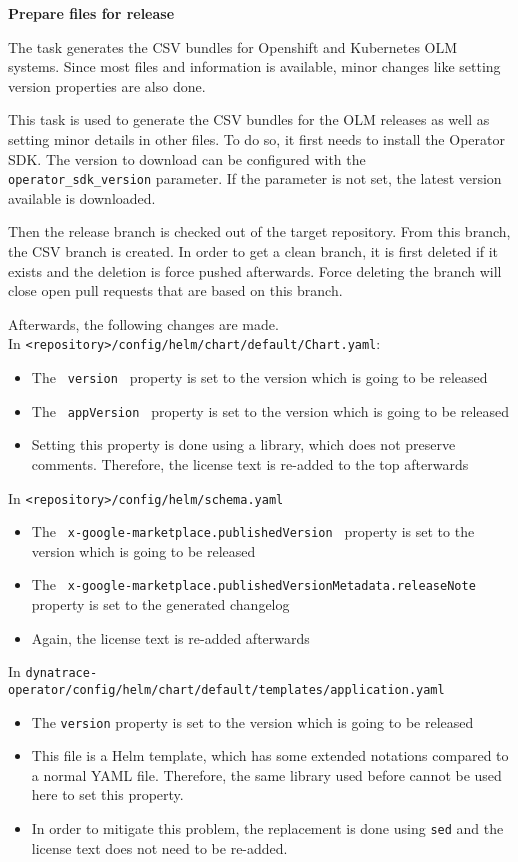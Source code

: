 \textbf{Prepare files for release}

The task generates the CSV bundles for Openshift and Kubernetes OLM systems.
Since most files and information is available, minor changes like setting version properties are also done.

This task is used to generate the CSV bundles for the OLM releases as well as setting minor details in other files.
To do so, it first needs to install the Operator SDK.
The version to download can be configured with the \verb|operator_sdk_version| parameter.
If the parameter is not set, the latest version available is downloaded.

\pagebreak

Then the release branch is checked out of the target repository.
From this branch, the CSV branch is created.
In order to get a clean branch, it is first deleted if it exists and the deletion is force pushed afterwards.
Force deleting the branch will close open pull requests that are based on this branch.

Afterwards, the following changes are made. \\
In \verb|<repository>/config/helm/chart/default/Chart.yaml|:
\begin{itemize}
    \item The \verb| version | property is set to the version which is going to be released
    \item The \verb| appVersion | property is set to the version which is going to be released
    \item Setting this property is done using a library, which does not preserve comments.
    Therefore, the license text is re-added to the top afterwards
\end{itemize}

In \verb|<repository>/config/helm/schema.yaml|
\begin{itemize}
    \item The \verb| x-google-marketplace.publishedVersion | property is set to the version which is going to be released
    \item The \verb| x-google-marketplace.publishedVersionMetadata.releaseNote | property is set to the generated changelog
    \item Again, the license text is re-added afterwards
\end{itemize}

In \verb|dynatrace-operator/config/helm/chart/default/templates/application.yaml|
\begin{itemize}
    \item The \verb|version| property is set to the version which is going to be released
    \item This file is a Helm template, which has some extended notations compared to a normal YAML file.
        Therefore, the same library used before cannot be used here to set this property.
    \item In order to mitigate this problem, the replacement is done using \verb|sed| and the license text does not need to be re-added.
\end{itemize}

